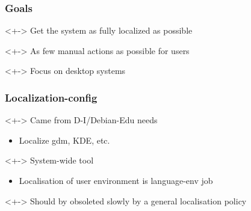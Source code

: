 \documentclass{beamer}
\begin{document}
\begin{frame}
  \frametitle{Goals}
	\begin{block}<+->
		{Get the system as fully localized as possible}
	\end{block}
	\begin{block}<+->
		{As few manual actions as possible for users}
	\end{block}
	\begin{block}<+->
		{Focus on desktop systems}
	\end{block}
\end{frame}

\begin{frame}
  \frametitle{Localization-config}
	\begin{block}<+->
		{Came from D-I/Debian-Edu needs}
		\begin{itemize}
		\item
			Localize gdm, KDE, etc.
		\end{itemize}
	\end{block}
	\begin{block}<+->
		{System-wide tool}
		\begin{itemize}
		\item
			Localisation of user environment is language-env job
		\end{itemize}
	\end{block}
	\begin{block}<+->
		{Should by obsoleted slowly by a general localisation policy}
	\end{block}
\end{frame}
\end{document}
